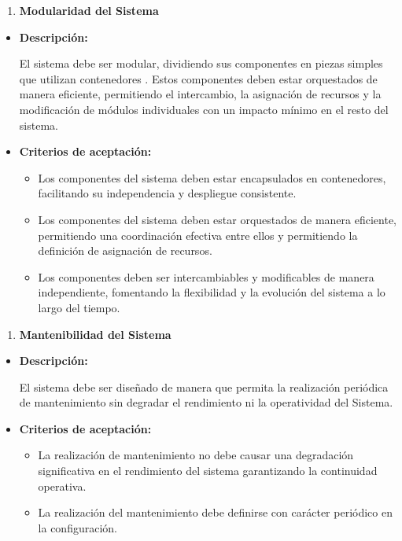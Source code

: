 \documentclass[
  12pt,
  openany]{book}
\providecommand{\tightlist}{%
  \setlength{\itemsep}{0pt}\setlength{\parskip}{0pt}}
\begin{document}
\begin{enumerate}
\def\labelenumi{\arabic{enumi}.}
\setcounter{enumi}{4}
\tightlist
\item
  \textbf{Modularidad del Sistema}
\end{enumerate}

\begin{itemize}
\item
  \textbf{Descripción:}

  El sistema debe ser modular, dividiendo sus componentes en piezas simples que utilizan contenedores . Estos componentes deben estar orquestados de manera eficiente, permitiendo el intercambio, la asignación de recursos y la modificación de módulos individuales con un impacto mínimo en el resto del sistema.
\item
  \textbf{Criterios de aceptación:}

  \begin{itemize}
  \item
    Los componentes del sistema deben estar encapsulados en contenedores, facilitando su independencia y despliegue consistente.
  \item
    Los componentes del sistema deben estar orquestados de manera eficiente, permitiendo una coordinación efectiva entre ellos y permitiendo la definición de asignación de recursos.
  \item
    Los componentes deben ser intercambiables y modificables de manera independiente, fomentando la flexibilidad y la evolución del sistema a lo largo del tiempo.
  \end{itemize}
\end{itemize}

\begin{enumerate}
\def\labelenumi{\arabic{enumi}.}
\setcounter{enumi}{5}
\tightlist
\item
  \textbf{Mantenibilidad del Sistema}
\end{enumerate}

\begin{itemize}
\item
  \textbf{Descripción:}

  El sistema debe ser diseñado de manera que permita la realización periódica de mantenimiento sin degradar el rendimiento ni la operatividad del Sistema.
\item
  \textbf{Criterios de aceptación:}

  \begin{itemize}
  \item
    La realización de mantenimiento no debe causar una degradación significativa en el rendimiento del sistema garantizando la continuidad operativa.
  \item
    La realización del mantenimiento debe definirse con carácter periódico en la configuración.
  \end{itemize}
\end{itemize}
\end{document}
